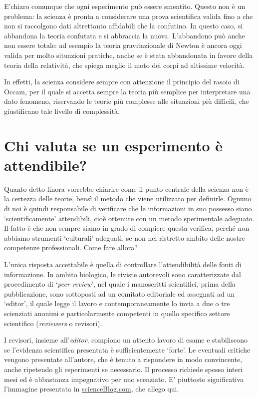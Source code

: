 \documentclass[a4paper,12pt,oneside]{book}
\theoremstyle{definition}
\theoremstyle{definition}
\theoremstyle{definition}
\theoremstyle{remark}
\begin{document}
E'chiaro comunque che ogni esperimento può essere smentito. Questo non è
un problema: la scienza è pronta a considerare una prova scientifica
valida fino a che non si raccolgono dati altrettanto affidabili che la
confutino. In questo caso, si abbandona la teoria confutata e si
abbraccia la nuova. L'abbandono può anche non essere totale: ad esempio
la teoria gravitazionale di Newton è ancora oggi valida per molto
situazioni pratiche, anche se è stata abbandonata in favore della teoria
della relatività, che spiega meglio il moto dei corpi ad altissime
velocità.

In effetti, la scienza considere sempre con attenzione il principio del
rasoio di Occam, per il quale si accetta sempre la teoria più semplice
per interpretare una dato fenomeno, riservando le teorie più complesse
alle situazioni più difficili, che giustificano tale livello di
complessità.

\section{Chi valuta se un esperimento è
attendibile?}\label{chi-valuta-se-un-esperimento-e-attendibile}

Quanto detto finora vorrebbe chiarire come il punto centrale della
scienza non è la certezza delle teorie, bensì il metodo che viene
utilizzato per definirle. Ognuno di noi è quindi responsabile di
verificare che le informazioni in suo possesso siano `scientificamente'
attendibili, cioè ottenute con un metodo sperimentale adeguato. Il fatto
è che non sempre siamo in grado di compiere questa verifica, perché non
abbiamo strumenti `culturali' adeguati, se non nel ristretto ambito
delle nostre competenze professionali. Come fare allora?

L'unica risposta accettabile è quella di controllare l'attendibilità
delle fonti di informazione. In ambito biologico, le riviste autorevoli
sono caratterizzate dal procedimento di `\emph{peer review}', nel quale
i manoscritti scientifici, prima della pubblicazione, sono sottoposti ad
un comitato editoriale ed assegnati ad un `editor', il quale legge il
lavoro e contemporaneamente lo invia a due o tre scienziati anonimi e
particolarmente competenti in quello specifico settore scientifico
(\emph{reviewers} o revisori).

I revisori, insieme all'\emph{editor}, compiono un attento lavoro di
esame e stabiliscono se l'evidenza scientifica presentata è
sufficientemente `forte'. Le eventuali critiche vengono presentate
all'autore, che è tenuto a rispondere in modo convincente, anche
ripetendo gli esperimenti se necessario. Il processo richiede spesso
interi mesi ed è abbastanza impegnativo per uno scenziato. E' piuttosto
significativa l'immagine presentata in
\href{http://scienceblogs.com/startswithabang/2013/06/07/the-4-jobs-of-a-referee-in-peer-review/}{scienceBlog.com},
che allego qui.
\end{document}
